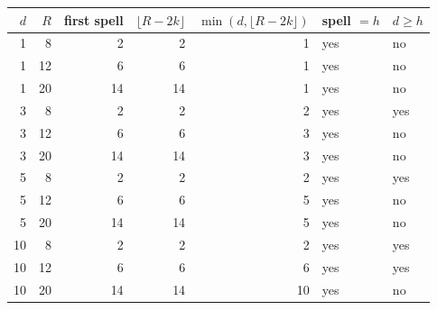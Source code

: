 \begin{tabular}{@{}r r r r r l l@{}}
\toprule
$d$ & $R$ & first spell & $\lfloor R-2k\rfloor$ & $\min(d,\lfloor R-2k\rfloor)$ & spell $=h$ & $d\ge h$ \\
\midrule
1 & 8 & 2 & 2 & 1 & yes & no \\
1 & 12 & 6 & 6 & 1 & yes & no \\
1 & 20 & 14 & 14 & 1 & yes & no \\
3 & 8 & 2 & 2 & 2 & yes & yes \\
3 & 12 & 6 & 6 & 3 & yes & no \\
3 & 20 & 14 & 14 & 3 & yes & no \\
5 & 8 & 2 & 2 & 2 & yes & yes \\
5 & 12 & 6 & 6 & 5 & yes & no \\
5 & 20 & 14 & 14 & 5 & yes & no \\
10 & 8 & 2 & 2 & 2 & yes & yes \\
10 & 12 & 6 & 6 & 6 & yes & yes \\
10 & 20 & 14 & 14 & 10 & yes & no \\
\bottomrule
\end{tabular}

